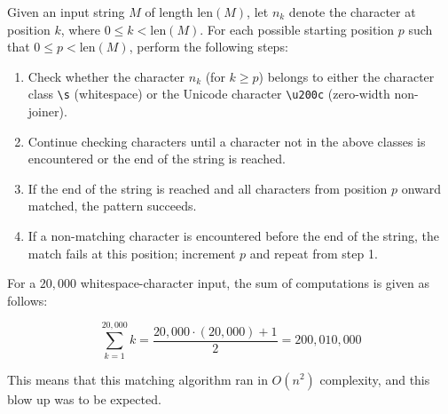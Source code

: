 Given an input string $M$ of length $\text{len}(M)$, let $n_k$ denote the character at position $k$, where $0 \leq k < \text{len}(M)$. For each possible starting position $p$ such that $0 \leq p < \text{len}(M)$, perform the following steps:

\begin{enumerate}
	\item Check whether the character $n_k$ (for $k \geq p$) belongs to either the character class \verb|\s| (whitespace) or the Unicode character \verb|\u200c| (zero-width non-joiner).
	\item Continue checking characters until a character not in the above classes is encountered or the end of the string is reached.
	\item If the end of the string is reached and all characters from position $p$ onward matched, the pattern succeeds.
	\item If a non-matching character is encountered before the end of the string, the match fails at this position; increment $p$ and repeat from step 1.
\end{enumerate}

For a $20{,}000$ whitespace-character input, the sum of computations is given as follows:

\begin{center}
	\[ \sum_{k=1}^{20,000} k = \frac{20,000 \cdot (20,000) + 1}{2} = 200,010,000 \]
\end{center}

This means that this matching algorithm ran in $O(n^2)$ complexity, and this blow up was to be expected.

%


